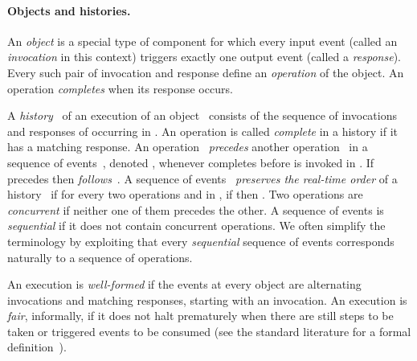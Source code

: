 \documentclass[oribibl]{llncs}
\theoremstyle{definition-boldhead}
\begin{document}
\paragraph{Objects and histories.}
An \emph{object} is a special type of component for which every input
event (called an \emph{invocation} in this context) triggers exactly
one output event (called a \emph{response}).  Every such pair of
invocation and response define an \emph{operation} of the object.  An
operation \emph{completes} when its response occurs.

A \emph{history}~ of an execution of an object~ consists of
the sequence of invocations and responses of  occurring in
.  An operation is called \emph{complete} in a history if it
has a matching response.
An operation~ \emph{precedes} another operation~ in a sequence
of events~, denoted , whenever  completes
before  is invoked in . If  precedes  then 
\emph{follows}~.  A sequence of events~ \emph{preserves the
  real-time order} of a history~ if for every two operations
 and  in , if  then .  Two
operations are \emph{concurrent} if neither one of them precedes the
other.  A sequence of events is \emph{sequential} if it does not
contain concurrent operations.
We often simplify the terminology by exploiting that every
\emph{sequential} sequence of events corresponds naturally to a
sequence of operations.


An execution is \emph{well-formed} if the events at every object are
alternating invocations and matching responses, starting with an
invocation.  An execution is \emph{fair}, informally, if it does not
halt prematurely when there are still steps to be taken or triggered
events to be consumed (see the standard literature for a formal
definition~\cite{Lynch96}).
\end{document}
